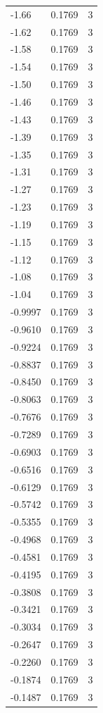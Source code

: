 \begin{longtable}{lrr}
  -1.66 & 0.1769 & 3 \\
  -1.62 & 0.1769 & 3 \\
  -1.58 & 0.1769 & 3 \\
  -1.54 & 0.1769 & 3 \\
  -1.50 & 0.1769 & 3 \\
  -1.46 & 0.1769 & 3 \\
  -1.43 & 0.1769 & 3 \\
  -1.39 & 0.1769 & 3 \\
  -1.35 & 0.1769 & 3 \\
  -1.31 & 0.1769 & 3 \\
  -1.27 & 0.1769 & 3 \\
  -1.23 & 0.1769 & 3 \\
  -1.19 & 0.1769 & 3 \\
  -1.15 & 0.1769 & 3 \\
  -1.12 & 0.1769 & 3 \\
  -1.08 & 0.1769 & 3 \\
  -1.04 & 0.1769 & 3 \\
  -0.9997 & 0.1769 & 3 \\
  -0.9610 & 0.1769 & 3 \\
  -0.9224 & 0.1769 & 3 \\
  -0.8837 & 0.1769 & 3 \\
  -0.8450 & 0.1769 & 3 \\
  -0.8063 & 0.1769 & 3 \\
  -0.7676 & 0.1769 & 3 \\
  -0.7289 & 0.1769 & 3 \\
  -0.6903 & 0.1769 & 3 \\
  -0.6516 & 0.1769 & 3 \\
  -0.6129 & 0.1769 & 3 \\
  -0.5742 & 0.1769 & 3 \\
  -0.5355 & 0.1769 & 3 \\
  -0.4968 & 0.1769 & 3 \\
  -0.4581 & 0.1769 & 3 \\
  -0.4195 & 0.1769 & 3 \\
  -0.3808 & 0.1769 & 3 \\
  -0.3421 & 0.1769 & 3 \\
  -0.3034 & 0.1769 & 3 \\
  -0.2647 & 0.1769 & 3 \\
  -0.2260 & 0.1769 & 3 \\
  -0.1874 & 0.1769 & 3 \\
  -0.1487 & 0.1769 & 3 \\

\end{longtable}
